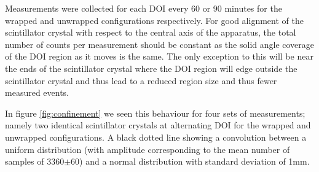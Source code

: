 Measurements were collected for each DOI every 60 or 90 minutes for the wrapped and unwrapped configurations respectively. For good alignment of the scintillator crystal with respect to the central axis of the apparatus, the total number of counts per measurement should be constant as the solid angle coverage of the DOI region as it moves is the same. The only exception to this will be near the ends of the scintillator crystal where the DOI region will edge outside the scintillator crystal and thus lead to a reduced region size and thus fewer measured events.

In figure \ref{fig:confinement} we seen this behaviour for four sets of measurements; namely two identical scintillator crystals at alternating DOI for the wrapped and unwrapped configurations. A black dotted line showing a convolution between a uniform distribution (with amplitude corresponding to the mean number of samples of 3360$\pm$60) and a normal distribution with standard deviation of 1mm.